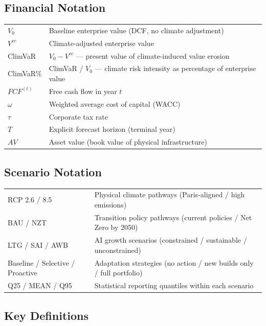 \subsection*{Financial Notation}

\begin{tabular}{@{}p{3cm}p{11cm}@{}}
$V_0$ & Baseline enterprise value (DCF, no climate adjustment) \\
$V^{cc}$ & Climate-adjusted enterprise value \\
ClimVaR & $V_0 - V^{cc}$ --- present value of climate-induced value erosion \\
ClimVaR\% & ClimVaR / $V_0$ --- climate risk intensity as percentage of enterprise value \\
$FCF^{(t)}$ & Free cash flow in year $t$ \\
$\omega$ & Weighted average cost of capital (WACC) \\
$\tau$ & Corporate tax rate \\
$T$ & Explicit forecast horizon (terminal year) \\
$AV$ & Asset value (book value of physical infrastructure) \\
\end{tabular}

\subsection*{Scenario Notation}

\begin{tabular}{@{}p{3cm}p{11cm}@{}}
RCP 2.6 / 8.5 & Physical climate pathways (Paris-aligned / high emissions) \\
BAU / NZT & Transition policy pathways (current policies / Net Zero by 2050) \\
LTG / SAI / AWB & AI growth scenarios (constrained / sustainable / unconstrained) \\
Baseline / Selective / Proactive & Adaptation strategies (no action / new builds only / full portfolio) \\
Q25 / MEAN / Q95 & Statistical reporting quantiles within each scenario \\
\end{tabular}

\subsection*{Key Definitions}

